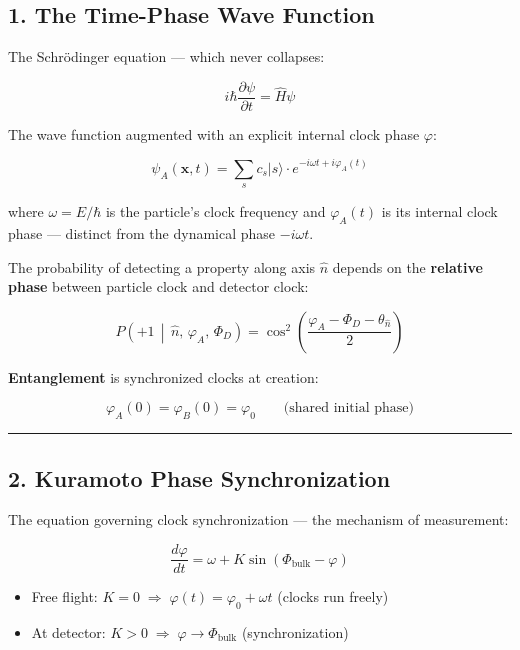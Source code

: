\documentclass[
]{article}
\providecommand{\tightlist}{%
  \setlength{\itemsep}{0pt}\setlength{\parskip}{0pt}}
\begin{document}
\subsection{1. The Time-Phase Wave
Function}\label{the-time-phase-wave-function}

The Schrödinger equation --- which never collapses:

\[i\hbar \frac{\partial \psi}{\partial t} = \hat{H}\psi\]

The wave function augmented with an explicit internal clock phase
\(\varphi\):

\[\psi_A(\mathbf{x}, t) = \sum_s c_s |s\rangle \cdot e^{-i\omega t + i\varphi_A(t)}\]

where \(\omega = E/\hbar\) is the particle's clock frequency and
\(\varphi_A(t)\) is its internal clock phase --- distinct from the
dynamical phase \(-i\omega t\).

The probability of detecting a property along axis \(\hat{n}\) depends
on the \textbf{relative phase} between particle clock and detector
clock:

\[P\!\left(+1 \,\middle|\, \hat{n},\, \varphi_A,\, \Phi_D\right) = \cos^2\!\left(\frac{\varphi_A - \Phi_D - \theta_{\hat{n}}}{2}\right)\]

\textbf{Entanglement} is synchronized clocks at creation:

\[\varphi_A(0) = \varphi_B(0) = \varphi_0 \qquad \text{(shared initial phase)}\]

\begin{center}\rule{0.5\linewidth}{0.5pt}\end{center}

\subsection{2. Kuramoto Phase
Synchronization}\label{kuramoto-phase-synchronization}

The equation governing clock synchronization --- the mechanism of
measurement:

\[\frac{d\varphi}{dt} = \omega + K \sin(\Phi_{\text{bulk}} - \varphi)\]

\begin{itemize}
\tightlist
\item
  Free flight:
  \(K = 0 \;\Rightarrow\; \varphi(t) = \varphi_0 + \omega t\) (clocks
  run freely)
\item
  At detector: \(K > 0 \;\Rightarrow\; \varphi \to \Phi_{\text{bulk}}\)
  (synchronization)
\end{itemize}
\end{document}
